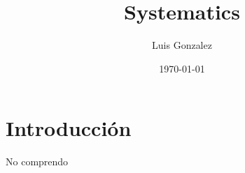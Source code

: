 \documentclass[12pt]{article}
\title{Systematics}
\author{Luis Gonzalez}
\date{\today}
\begin{document}
\maketitle

\section{Introducción}

No comprendo
\end{document}
